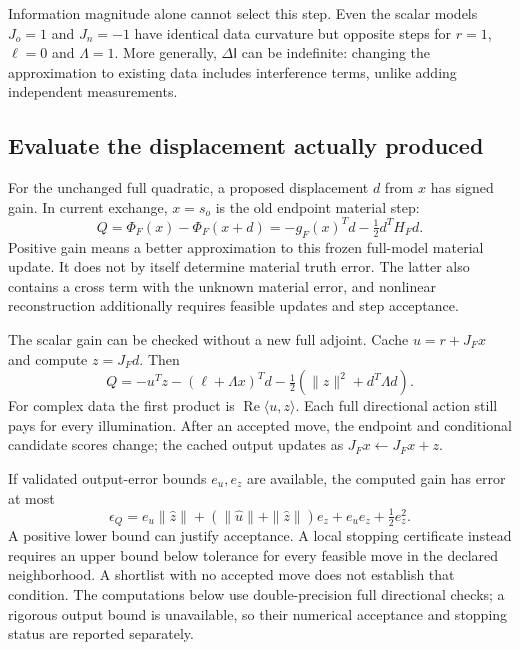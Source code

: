 Information magnitude alone cannot select this step. Even the scalar models $J_o=1$ and $J_n=-1$ have identical data curvature but opposite steps for $r=1$, $\ell=0$ and $\Lambda=1$. More generally, $\Delta\mathsf I$ can be indefinite: changing the approximation to existing data includes interference terms, unlike adding independent measurements.

\subsection{Evaluate the displacement actually produced}
For the unchanged full quadratic, a proposed displacement $d$ from $x$ has signed gain. In current exchange, $x=s_o$ is the old endpoint material step:
\begin{equation}\label{eq:exchange-gain}
 Q=\Phi_F(x)-\Phi_F(x+d)=-g_F(x)^Td-\tfrac12d^TH_Fd.
\end{equation}
Positive gain means a better approximation to this frozen full-model material update. It does not by itself determine material truth error. The latter also contains a cross term with the unknown material error, and nonlinear reconstruction additionally requires feasible updates and step acceptance.

The scalar gain can be checked without a new full adjoint. Cache $u=r+J_Fx$ and compute $z=J_Fd$. Then
\begin{equation}\label{eq:directional-exchange-gain}
 Q=-u^Tz-(\ell+\Lambda x)^Td-\tfrac12(\|z\|^2+d^T\Lambda d).
\end{equation}
For complex data the first product is $\operatorname{Re}\langle u,z\rangle$. Each full directional action still pays for every illumination. After an accepted move, the endpoint and conditional candidate scores change; the cached output updates as $J_Fx\leftarrow J_Fx+z$.

If validated output-error bounds $e_u,e_z$ are available, the computed gain has error at most
\begin{equation}\label{eq:exchange-gain-bound}
 \epsilon_Q=e_u\|\widehat z\|+(\|\widehat u\|+\|\widehat z\|)e_z+e_ue_z+\tfrac12 e_z^2.
\end{equation}
A positive lower bound can justify acceptance. A local stopping certificate instead requires an upper bound below tolerance for every feasible move in the declared neighborhood. A shortlist with no accepted move does not establish that condition. The computations below use double-precision full directional checks; a rigorous output bound is unavailable, so their numerical acceptance and stopping status are reported separately.

